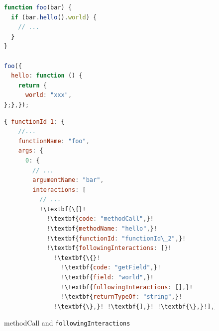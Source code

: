 \documentclass[sigconf]{acmart}
\begin{document}
\begin{figure}[t]
      \begin{lstlisting}[language=JavaScript,numbers=none]
function foo(bar) {
  if (bar.hello().world) {
    // ...
  }
}

foo({
  hello: function () {
    return {
      world: "xxx",
};},});    
      \end{lstlisting}

      \begin{lstlisting}[language=JavaScript,numbers=none,escapechar=!]
{ functionId_1: {
    //...
    functionName: "foo",
    args: {
      0: {
        // ...
        argumentName: "bar",
        interactions: [
          // ...
          !\textbf{\{}!
            !\textbf{code: "methodCall",}!
            !\textbf{methodName: "hello",}!
            !\textbf{functionId: "functionId\_2",}!
            !\textbf{followingInteractions: [}!
              !\textbf{\{}!
                !\textbf{code: "getField",}!
                !\textbf{field: "world",}!
                !\textbf{followingInteractions: [],}!
                !\textbf{returnTypeOf: "string",}!
              !\textbf{\},}! !\textbf{],}! !\textbf{\},}!],},},},}
      \end{lstlisting}
  \caption{\texttt{}{methodCall} and \texttt{followingInteractions}}
  \label{fig:example-method-call-interaction}
\end{figure}
\end{document}
